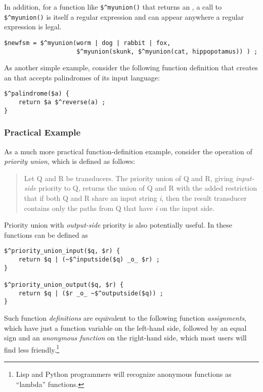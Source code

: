 \noindent
In addition, for a function like \verb!$^myunion()! that returns an \fsm{}, a call to \verb!$^myunion()! is
itself a regular expression and can appear anywhere a regular expression is legal.

\begin{Verbatim}
$newfsm = $^myunion(worm | dog | rabbit | fox, 
                    $^myunion(skunk, $^myunion(cat, hippopotamus)) ) ;
\end{Verbatim}

As another simple example, consider the following function definition that creates an \fsm{} that accepts
palindromes of its input language:

\begin{Verbatim}
$^palindrome($a) {
    return $a $^reverse(a) ;
}
\end{Verbatim}


\subsubsection{Practical Example}

As a much more practical function-definition example, consider the operation of \emph{priority union}, which is defined as follows:

\begin{quotation}
Let Q and R be transducers.  The priority union of Q and
R, giving \emph{input-side} priority to Q, returns the union of Q and R
with the added 
restriction that if both Q and R share an input string \emph{i}, then
the result transducer contains only the paths from Q that have
\emph{i} on the
input side.
\end{quotation}

\noindent
Priority union with \emph{output-side} priority is also potentially useful.
In \Kleene{} these functions can be defined as

\begin{Verbatim}
$^priority_union_input($q, $r) {
	return $q | (~$^inputside($q) _o_ $r) ;
}

$^priority_union_output($q, $r) {
	return $q | ($r _o_ ~$^outputside($q)) ;
}
\end{Verbatim}

\noindent
Such function \emph{definitions} are equivalent to the following function
\emph{assignments}, which have just a function variable on the left-hand side, followed by an equal sign
and an \emph{anonymous function} on the right-hand side, which most users will find less
friendly.\footnote{Lisp and Python programmers
will recognize anonymous functions as ``lambda'' functions.}  

